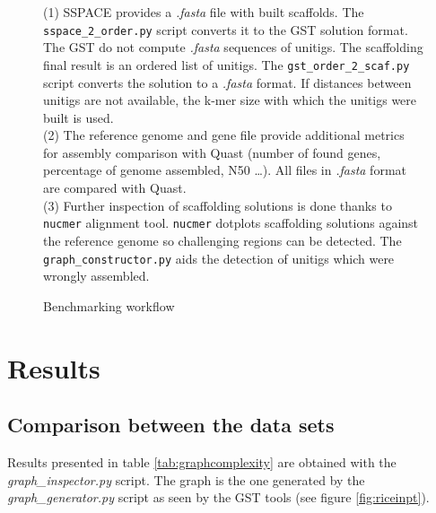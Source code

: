 \documentclass[12pt]{article}
\begin{document}
\begin{figure}[h!]
\begin{center}
{
}
\end{center}
\caption{Benchmarking workflow}
\label{fig:benchwork}
\footnotesize (1) SSPACE provides a \textit{.fasta} file with built scaffolds. The \texttt{sspace\_2\_order.py} script converts it to the GST solution format. The GST do not compute \textit{.fasta} sequences of unitigs. The scaffolding final result is an ordered list of unitigs. The \texttt{gst\_order\_2\_scaf.py} script converts the solution to a \textit{.fasta} format. If distances between unitigs are not available, the k-mer size with which the unitigs were built is used. \\
\footnotesize (2) The reference genome and gene file provide additional metrics for assembly comparison with Quast (number of found genes, percentage of genome assembled, N50 \ldots). All files in \textit{.fasta} format are compared with Quast. \\
\footnotesize (3) Further inspection of scaffolding solutions is done thanks to \texttt{nucmer} alignment tool. \texttt{nucmer} dotplots scaffolding solutions against the reference genome so challenging regions can be detected. The \texttt{graph\_constructor.py} aids the detection of unitigs which were wrongly assembled.
\end{figure}

\clearpage
\section{Results}\label{sec:res}
\subsection{Comparison between the data sets}
Results presented in table \ref{tab:graphcomplexity} are obtained with the \textit{graph\_inspector.py} script. The graph is the one generated by the \textit{graph\_generator.py} script as seen by the GST tools (see figure \ref{fig:riceinpt}). 
\end{document}
